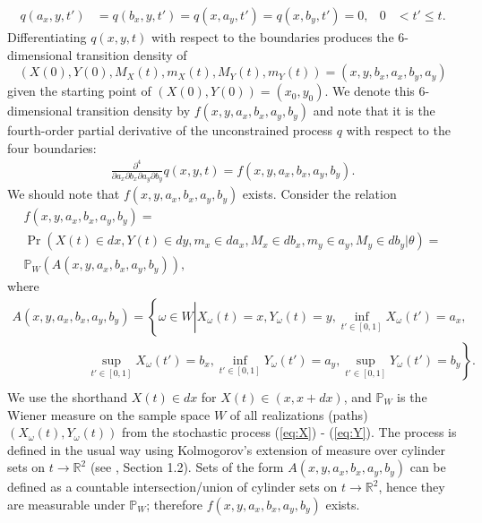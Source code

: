 \begin{align}
  q(a_x, y,t') &= q(b_x,y,t') = q(x,a_y,t') = q(x,b_y,t') = 0, & 0 &< t' \leq t. \label{eq:2}
\end{align}
Differentiating $q(x,y,t)$ with respect to the boundaries produces the
6-dimensional transition density of
\[(X(0), Y(0), M_X(t), m_X(t), M_Y(t), m_Y(t)) =
  (x,y,b_x,a_x,b_y,a_y)\] given the starting point of
$(X(0), Y(0)) = (x_0, y_0)$. We denote this 6-dimensional transition
density by $f(x,y,a_x,b_x,a_y,b_y)$ and note that it is the
fourth-order partial derivative of the unconstrained process $q$ with
respect to the four boundaries:
\begin{align}
  \frac{\partial^4}{\partial a_x \partial b_x \partial a_y \partial b_y} q(x,y,t) = f(x,y,a_x,b_x,a_y,b_y).
  \label{eq:pdf}
\end{align}
We should note that $f(x,y,a_x,b_x,a_y,b_y)$ exists. Consider the relation
\begin{multline*}
  f(x,y,a_x,b_x,a_y,b_y) = \\
  \Pr\left(X(t) \in dx, Y(t) \in dy, m_x \in da_x, M_x \in db_x, m_y
    \in a_y, M_y \in db_y \left| \theta \right.\right) = \\
  \mathbb{P}_{W}\left( A(x,y,a_x,b_x,a_y,b_y) \right),
  \end{multline*}
  where
  \begin{multline*}
    A(x,y,a_x,b_x,a_y,b_y) = \left\{ \omega \in W \left| X_\omega(t) = x,
     Y_\omega(t)=y, \inf_{t'\in [0,1]} X_\omega(t') = a_x, \right.  \right. \\
   \qquad \qquad \qquad \left. \sup_{t'\in [0,1]} X_\omega(t') = b_x, \inf_{t'\in [0,1]}
         Y_\omega(t') = a_y, \sup_{t'\in [0,1]} Y_\omega(t') = b_y
     \right\}. \\
   \end{multline*}
   We use the shorthand $X(t) \in dx$ for $X(t) \in (x, x+dx)$, and
   $\mathbb{P}_{W}$ is the Wiener measure on the sample space $W$ of
   all realizations (paths) $(X_\omega(t), Y_\omega(t))$ from the
   stochastic process (\ref{eq:X}) - (\ref{eq:Y}). The process is defined in the usual
   way using Kolmogorov's extension of measure over cylinder sets on
   $t \to \mathbb{R}^2$ (see \cite{freidlin1985functional}, Section
   1.2). Sets of the form $A(x,y,a_x,b_x,a_y,b_y)$ can be defined as a
   countable intersection/union of cylinder sets on
   $t \to \mathbb{R}^2$, hence they are measurable under
   $\mathbb{P}_{W}$; therefore $f(x,y,a_x,b_x,a_y,b_y)$ exists.

